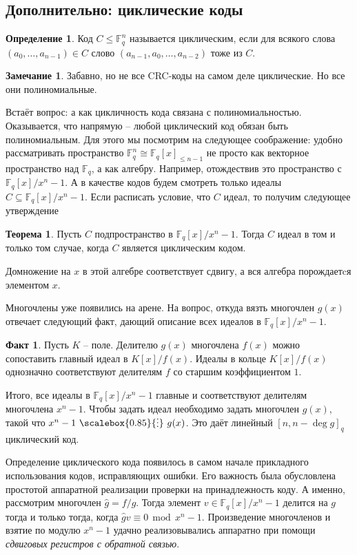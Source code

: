 \documentclass[12pt,a4paper,oneside]{book}
\theoremstyle{definition}
\newtheorem*{rem}{\color{green!50!blue}Замечание}
\newtheorem*{defn}{\color{yellow!30!red} Определение}
\newtheorem*{fact}{Факт}
\newtheorem{thm}{\color{red!40!black}Теорема}
\renewcommand{\leq}{\leqslant}
\renewcommand{\mod}{\,\operatorname{mod}\,}
\newcommand{\di}{\mathop{\,\scalebox{0.85}{\raisebox{-1.2pt}[0.5\height]{\vdots}}\,}}
\newcommand{\F}{\mathbb F}
\def\thrm{\begin{thm}}
\def\ethrm{\end{thm}}
\def\dfn{\begin{defn}}
\def\edfn{\end{defn}}
\def\rm{\begin{rem}}
\def\erm{\end{rem}}
\def\fct{\begin{fact}}
\def\efct{\end{fact}}
\begin{document}
\subsection{Дополнительно:  циклические коды}

\dfn Код $C\leq \F_q^n$ называется циклическим, если для всякого слова $(a_0,\dots,a_{n-1})\in C$ слово $(a_{n-1},a_0,\dots,a_{n-2})$ тоже из $C$. 
\edfn

\rm Забавно, но не все CRC-коды на самом деле циклические. Но все они полиномиальные.
\erm


Встаёт вопрос: а как цикличность кода связана с полиномиальностью. Оказывается, что напрямую -- любой циклический код обязан быть полиномиальным. Для этого мы посмотрим на следующее соображение: удобно рассматривать пространство $\F_q^n \cong \F_q[x]_{\leq n-1}$ не просто как векторное пространство над $\F_q$, а как алгебру. Например, отождествив это пространство с $\F_q[x]/x^n-1$. А в качестве кодов будем смотреть только идеалы $C \subseteq \F_q[x]/x^n-1$. Если расписать условие, что $C$ идеал, то получим следующее утверждение

\thrm Пусть $C$ подпространство в $\F_q[x]/x^n-1$. Тогда $C$ идеал в том и только том случае, когда $C$ является циклическим кодом.
\ethrm
\proof Домножение на $x$ в этой алгебре соответствует сдвигу, а вся алгебра порождаетcя элементом $x$.
\endproof

Многочлены уже появились на арене. На вопрос, откуда вязть многочлен $g(x)$ отвечает следующий факт, дающий описание всех идеалов в $\F_q[x]/x^n-1$.

\fct Пусть $K$ -- поле. Делителю $g(x)$ многочлена $f(x)$ можно сопоставить главный идеал в $K[x]/f(x)$. Идеалы в кольце $K[x]/f(x)$ однозначно соответствуют делителям $f$ со старшим коэффициентом $1$.
\efct

Итого, все идеалы в $\F_q[x]/x^n-1$ главные и соответствуют делителям многочлена $x^n-1$. Чтобы задать идеал необходимо задать многочлен $g(x)$, такой что $ x^n-1 \di g(x)$. Это даёт линейный $[n, n-\deg g]_q$ циклический код.

Определение циклического кода появилось в самом начале прикладного использования кодов, исправляющих ошибки. Его важность была обусловлена простотой аппаратной реализации проверки на принадлежность коду. А именно, рассмотрим многочлен $\hat{g}=f/g$. Тогда элемент $v \in \F_q[x]/x^n-1$ делится на $g$ тогда и только тогда, когда $\hat g v \equiv 0 \mod x^n-1$. 
Произведение многочленов и взятие по модулю $x^n-1$ удачно реализовывались аппаратно при помощи {\it сдвиговых регистров с обратной связью}.
\end{document}
